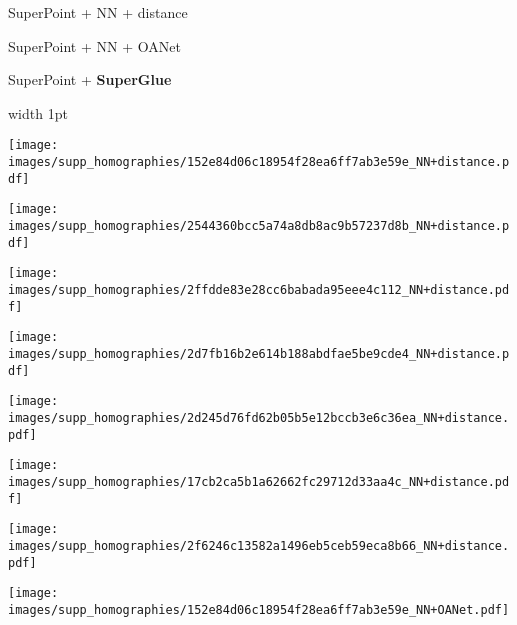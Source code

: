 \documentclass[10pt,twocolumn,letterpaper]{article}
\renewcommand{\*}[1]{\mathbf{#1}}
\renewcommand{\b}[1]{\textbf{#1}}
\newcommand{\0}{\phantom{0}}
\begin{document}
\begin{figure*}[ht!]
\vspace{-2mm}
\centering
\def\iwidth{0.315}
\begin{minipage}{\iwidth\textwidth}
    \centering
    \small{SuperPoint + NN + distance}
\end{minipage}\hspace{1mm}\begin{minipage}{\iwidth\textwidth}
    \centering
    \small{SuperPoint + NN + OANet}
\end{minipage}\hspace{1mm}\begin{minipage}{\iwidth\textwidth}
    \centering
    \small{SuperPoint + \b{SuperGlue}}
\end{minipage}

\begin{minipage}{0.02\textwidth}
\end{minipage}\hfill{\vline width 1pt}\hfill
\hspace{1mm}\begin{minipage}{\iwidth\textwidth}
    \texttt{[image: images/supp\_homographies/152e84d06c18954f28ea6ff7ab3e59e\_NN+distance.pdf]}
    
    \vspace{.5mm}
    \texttt{[image: images/supp\_homographies/2544360bcc5a74a8db8ac9b57237d8b\_NN+distance.pdf]}
    
    \vspace{.5mm}
    \texttt{[image: images/supp\_homographies/2ffdde83e28cc6babada95eee4c112\_NN+distance.pdf]}
    
    \vspace{.5mm}
    \texttt{[image: images/supp\_homographies/2d7fb16b2e614b188abdfae5be9cde4\_NN+distance.pdf]}
    
    \vspace{.5mm}
    \texttt{[image: images/supp\_homographies/2d245d76fd62b05b5e12bccb3e6c36ea\_NN+distance.pdf]}
    
    \vspace{.5mm}
    \texttt{[image: images/supp\_homographies/17cb2ca5b1a62662fc29712d33aa4c\_NN+distance.pdf]}
    
    \vspace{.5mm}
    \texttt{[image: images/supp\_homographies/2f6246c13582a1496eb5ceb59eca8b66\_NN+distance.pdf]}
\end{minipage}\hspace{1mm}\begin{minipage}{\iwidth\textwidth}
    \texttt{[image: images/supp\_homographies/152e84d06c18954f28ea6ff7ab3e59e\_NN+OANet.pdf]}
    

\end{minipage}
\end{figure*}
\end{document}
